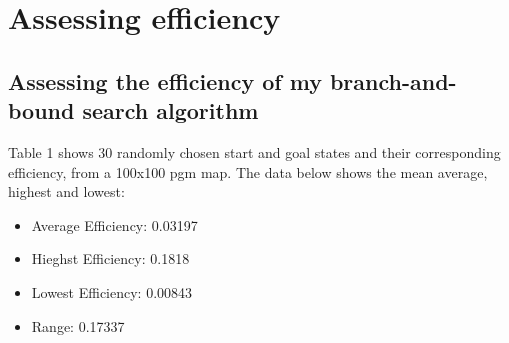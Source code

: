\documentclass[11pt,oneside]{article}
\begin{document}
\section{Assessing efficiency}
 

\subsection{Assessing the efficiency of my branch-and-bound search algorithm}
Table 1 shows 30 randomly chosen start and goal states and their corresponding efficiency, from a 100x100 pgm map. The data below shows the mean average, highest and lowest:
\begin{itemize}
	\item Average Efficiency: 0.03197
	\item Hieghst Efficiency: 0.1818
	\item Lowest Efficiency: 0.00843
	\item Range: 0.17337
\end{itemize}
\end{document}
